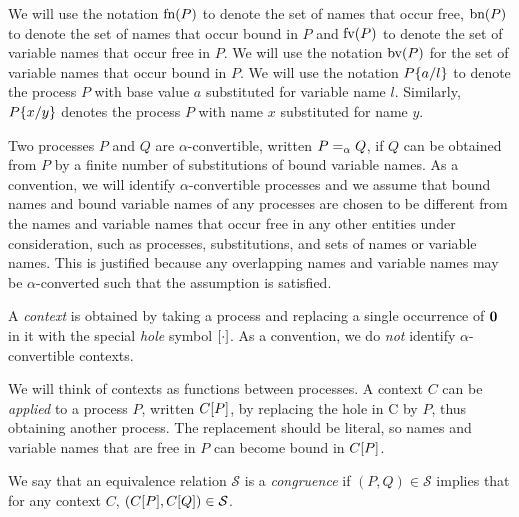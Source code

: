 We will use the notation \( \textrm{fn}(P) \) to denote the set of
names that occur free,
\( \textrm{bn}(P) \) to denote the set of names that occur bound
in \( P \) and  \( \textrm{fv}(P) \)
to denote the set of variable names that occur free
in \( P \).  We will use the notation \( \textrm{bv}(P) \)
for the set of variable names that occur bound
in \( P \).  We will use the notation \( P\{a/l\} \) to denote
the process \( P \) with base value \( a \) substituted for variable name
\( l \). Similarly, \( P\{x/y\} \) denotes the process
\( P \) with name \( x \) substituted for name \( y \).

Two processes \( P \) and \( Q \) are \( \alpha \)-convertible,
written \( P =_{\alpha} Q \), if \( Q \) can be obtained from \( P \)
by a finite number of substitutions of bound variable names.  As a
convention, we will identify \( \alpha \)-convertible processes and we
assume that bound names and bound variable names of any processes are
chosen to be different from the names and variable names that occur
free in any other entities under consideration, such as processes,
substitutions, and sets of names or variable names.  This is justified
because any overlapping names and variable names may be
\( \alpha \)-converted such that the assumption is satisfied.


A \emph{context} is obtained by taking a process and replacing a single occurrence of \( \bm{0} \) in it with the special \emph{hole} symbol \( [\cdot] \).
As a convention, we do \emph{not} identify \( \alpha \)-convertible contexts.

We will think of contexts as functions between processes.
A context \( C \) can be \emph{applied} to a process \( P \), written \( C[P] \), by replacing the hole in C by \( P \), thus obtaining another process.
The replacement should be literal, so names and variable names that are free in \( P \) can become bound in \( C[P] \).

We say that an equivalence relation \( \mathcal{S} \) is a \emph{congruence} if \( (P,Q) \in \mathcal{S} \) implies that for any context \( C \), \( (C[P], C[Q]) \in \mathcal{S} \).
